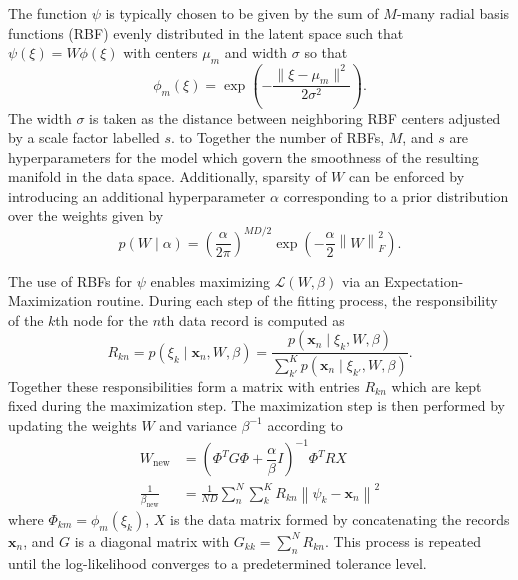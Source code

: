 \documentclass[remotesensing,article,submit,pdftex,moreauthors]{Definitions/mdpi}
\begin{document}
The function $\psi$ is typically chosen to be given by the sum of $M$-many radial basis functions (RBF) evenly distributed in the latent space such that $\psi(\xi) = W\phi(\xi)$ with centers $\mu_m$ and width $\sigma$ so that
\begin{equation}
    \phi_m(\xi) = \exp\left(-\dfrac{\lVert \xi - \mu_m \rVert^2}{2\sigma^2}\right).
\end{equation}
The width $\sigma$ is taken as the distance between neighboring RBF centers adjusted by a scale factor labelled $s$. to Together the number of RBFs, $M$, and $s$ are hyperparameters for the model which govern the smoothness of the resulting manifold in the data space. Additionally, sparsity of $W$ can be enforced by introducing an additional hyperparameter $\alpha$ corresponding to a prior distribution over the weights given by
\begin{equation}\label{eq:weight-prior}
    p(W \mid \alpha) =  \left( \frac{\alpha}{2\pi} \right)^{MD/2}\exp\left(-\frac{\alpha}{2}\left\lVert W \right\rVert_{F}^2\right).
\end{equation}

The use of RBFs for $\psi$ enables maximizing $\mathcal{L}(W,\beta)$ via an Expectation-Maximization routine. During each step of the fitting process, the responsibility of the $k$th node for the $n$th data record is computed as 
\begin{equation}\label{eq:responsibility}
    R_{kn} = p(\xi_k \mid \mathbf{x}_n, W, \beta) = \dfrac{p(\mathbf{x}_n \mid \xi_k, W, \beta)}{\sum\limits_{k'}^{K} p(\mathbf{x}_n \mid \xi_{k'}, W, \beta)}.
\end{equation}
Together these responsibilities form a matrix with entries $R_{kn}$ which are kept fixed during the maximization step. The maximization step is then performed by updating the weights $W$ and variance $\beta^{-1}$ according to
\begin{align}\label{eq:m-step}
    W_{\text{new}} &= \left(\Phi^T G \Phi + \dfrac{\alpha}{\beta}I \right)^{-1} \Phi^T R X  \\
    \frac{1}{\beta_{\text{new}}} &= \frac{1}{ND} \sum\limits_{n}^{N} \sum\limits_{k}^{K} R_{kn} \left\lVert \psi_k - \mathbf{x}_n \right\rVert^2
\end{align}
where $\Phi_{km} = \phi_m(\xi_k)$, $X$ is the data matrix formed by concatenating the records $\mathbf{x}_n$, and $G$ is a diagonal matrix with $G_{kk} = \sum\limits_n^N R_{kn}$. This process is repeated until the log-likelihood converges to a predetermined tolerance level.
\end{document}
